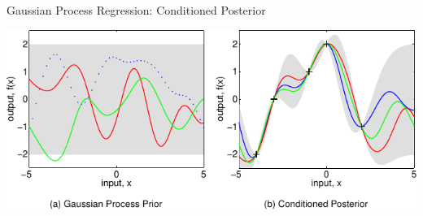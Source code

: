 \documentclass[10pt, compress, aspectratio=169, xcolor={table,usenames,dvipsnames}]{beamer}
\begin{document}
\begin{frame}[label={sec:org42fb39a}]{Gaussian Process Regression: Conditioned Posterior}
\begin{center}
\includegraphics[width=.99\columnwidth]{../../../img/rasmussen_prior_posterior.pdf}
\end{center}

\end{frame}
\end{document}
